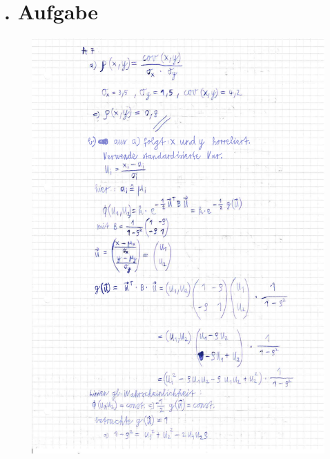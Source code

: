 \documentclass[
  bibliography=totoc,     %
  captions=tableheading,  %
  titlepage=firstiscover, %
]{scrartcl}
\begin{document}
\section{. Aufgabe}
  \begin{figure}[H]
    \centering
    \includegraphics[width=\textwidth]{IMG_20181101_0001.pdf}
  \end{figure}
\end{document}
